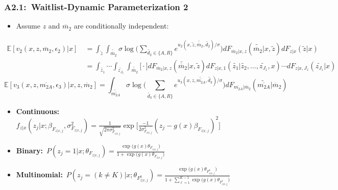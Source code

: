 \documentclass[12pt, aspectratio=169]{beamer}
\begin{document}
\begin{frame}[label=wdp2]
\frametitle{A2.1:\ Waitlist-Dynamic Parameterization 2}
\begin{itemize}
\item[$\bigstar$] Assume $z$ and $\ddot{m_2}$ are conditionally independent:
\end{itemize}
\footnotesize
\begin{align*}
\mathbb{E}[v_2(x,z,\ddot{m_2},\epsilon_2)|x]\ &= \int_{\widetilde z}\int_{\widetilde{\ddot{m_2}}}\sigma\log\bigg(\sum_{\widetilde{d_2}\in\{A,R\}}e^{u_2(x,\widetilde z,\widetilde{\ddot{m_2}},\widetilde{d_2})/\sigma}\bigg)dF_{\ddot{m_2}|x,z}(\widetilde{\ddot{m_2}}|x,\widetilde z)dF_{z|x}(\widetilde z|x) \\
&= \int_{\widetilde{z_1}}\cdots\int_{\widetilde{z_{J_z}}}\int_{\widetilde{\ddot{m_2}}}\bigg[\cdot\bigg]dF_{\ddot{m_2}|x,z}(\widetilde{\ddot{m_2}}|x,\widetilde z)dF_{z|x,1}(\widetilde{z_1}|\widetilde{z_2},\dots,\widetilde{z_{J_z}},x)\cdots dF_{z|x,{J_z}}(\widetilde{z_{J_z}}|x)
\end{align*}
\begin{equation*}
\mathbb{E}[v_3(x,z,\overline{m_{2A}},\epsilon_3)|x,z,\ddot{m_2}] = \int_{\widetilde{\overline{m_{2A}}}}\sigma\log\bigg(\sum_{\widetilde{d_3}\in\{A,R\}}e^{u_3(x,z,\widetilde{\overline{m_{2A}}},\widetilde{d_3})/\sigma}\bigg)dF_{\overline{m_{2A}}|\ddot{m_2}}(\widetilde{\overline{m_{2A}}}|\ddot{m_2})
\end{equation*}
\normalsize
\begin{itemize}
\item \textbf{Continuous:}\ \footnotesize $f_{z|x}(z_j|x;\beta_{F_{z|x,j}},\sigma^2_{F_{z|x,j}}) = \frac{1}{\sqrt{2\pi\sigma^2_{F_{z|x,j}}}}\exp\Big[\frac{-1}{2\sigma^2_{F_{z|x,j}}}(z_j-g(x)\beta_{F_{z|x,j}})^2\Big]$ \normalsize
\vspace{-5pt}
\item \textbf{Binary:}\ \footnotesize $P(z_j=1|x;\theta_{F_{z|x,j}}) = \frac{\exp\big(g(x)\theta_{F_{z|x,j}}\big)}{1+\exp\big(g(x)\theta_{F_{z|x,j}}\big)}$ \normalsize
\vspace{-10pt}
\item \textbf{Multinomial:}\ \footnotesize $P(z_j=(k\neq K)|x;\theta_{F_{z|x,j}^k}) = \frac{\exp\Big(g(x)\theta_{F_{z|x,j}^k}\Big)}{1+\sum_{\ell=1}^{K-1}\exp\Big(g(x)\theta_{F_{z|x,j}^\ell}\Big)}$ \normalsize
\end{itemize}
\vspace{-10pt}
\hyperlink{wmo}{}
\end{frame}
\end{document}
